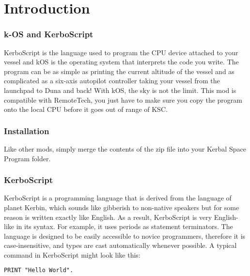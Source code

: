 \part{Introduction}
	\section*{k-OS and KerboScript}
		KerboScript is the language used to program the CPU device attached to your vessel and kOS is the operating system that interprets the code you write. The program can be as simple as printing the current altitude of the vessel and as complicated as a six-axis autopilot controller taking your vessel from the launchpad to Duna and back! With kOS, the sky is not the limit.
		This mod is compatible with RemoteTech, you just have to make sure you copy the program onto the local CPU before it goes out of range of KSC.
	\section*{Installation}
		Like other mods, simply merge the contents of the zip file into your Kerbal Space Program folder.
	\section*{KerboScript}
		KerboScript is a programming language that is derived from the language of planet Kerbin, which sounds like gibberish to non-native speakers but for some reason is written exactly like English. As a result, KerboScript is very English-like in its syntax. For example, it uses periods as statement terminators.
		The language is designed to be easily accessible to novice programmers, therefore it is case-insensitive, and types are cast automatically whenever possible.
		A typical command in KerboScript might look like this:
					
\begin{lstlisting}[frame=single,language=XML]
PRINT "Hello World".
\end{lstlisting} 
